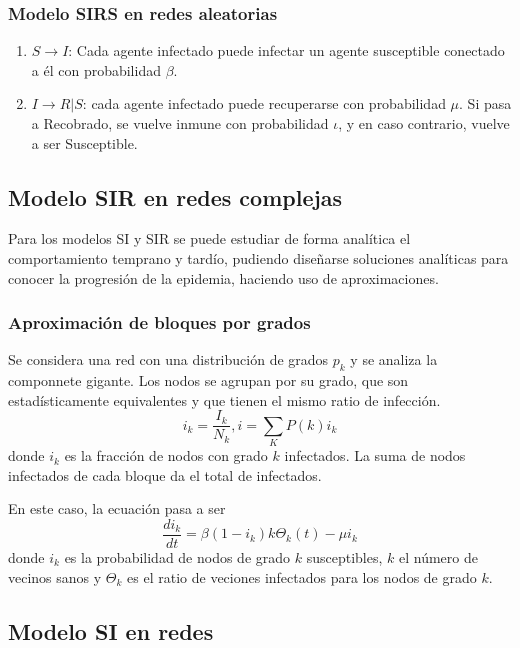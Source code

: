 \documentclass[10pt,spanish, landscape, twocolumn]{article}
\begin{document}
\subsubsection{\textcolor{temasiete}Modelo SIRS en redes aleatorias}

\begin{enumerate}[$\bullet$]
    \item \textcolor{temasiete}{$S\rightarrow I$}: Cada agente infectado puede infectar un agente susceptible conectado a él con probabilidad $\beta$.
    \item \textcolor{temasiete}{$I\rightarrow R|S$}: cada agente infectado puede recuperarse con probabilidad $\mu$. Si pasa a Recobrado, se vuelve inmune con probabilidad $\iota$, y en caso contrario, vuelve a ser Susceptible.
\end{enumerate}

\subsection{\textcolor{temasiete}Modelo SIR en redes complejas}

Para los modelos SI y SIR se puede estudiar de forma analítica el comportamiento temprano y tardío, pudiendo diseñarse soluciones analíticas para conocer la progresión de la epidemia, haciendo uso de aproximaciones.

\subsubsection{\textcolor{temasiete}Aproximación de bloques por grados}

Se considera una red con una distribución de grados $p_k$ y se analiza la componnete gigante. Los nodos se agrupan por su grado, que son estadísticamente equivalentes y que tienen el mismo ratio de infección.
$$i_k = \frac{I_k}{N_k}, i = \sum_K P(k)i_k$$
donde $i_k$ es la fracción de nodos con grado $k$ infectados. La suma de nodos infectados de cada bloque da el total de infectados.

En este caso, la ecuación pasa a ser $$\frac{di_k}{dt} = \beta(1-i_k)k\Theta_k(t)-\mu i_k$$
donde $i_k$ es la probabilidad de nodos de grado $k$ susceptibles, $k$ el número de vecinos sanos y $\Theta_k$ es el ratio de veciones infectados para los nodos de grado $k$.

\subsection{\textcolor{temasiete}Modelo SI en redes}
\end{document}
